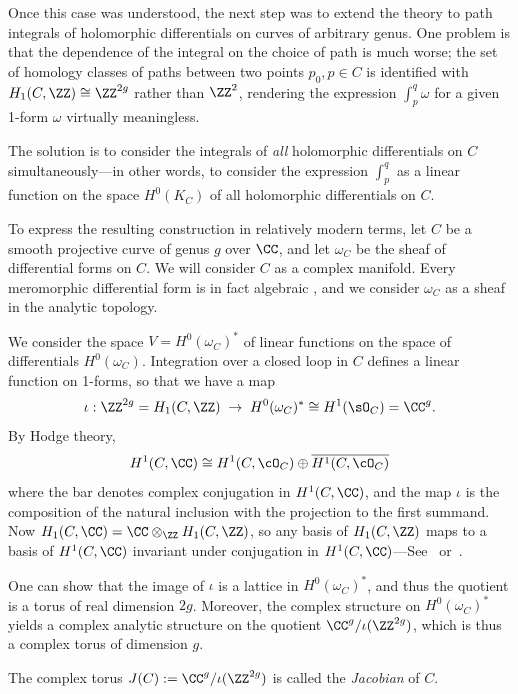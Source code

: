 Once this case was understood, the next step was to extend the theory to path integrals of holomorphic differentials on curves of arbitrary genus. One problem is that the dependence of the integral on the choice of path is much worse; the set of homology classes of paths between two points $p_0, p \in C$ is identified with $H_1(C,\ZZ) \cong \ZZ^{2g}$ rather than $\ZZ^2$, rendering the expression $\int_p^q \omega$ for a given 1-form $\omega$ virtually meaningless.

The solution is to  consider the integrals of \emph{all} holomorphic differentials on $C$ simultaneously---in other words, to consider the expression $\int_p^q$ as a linear function on the space $H^0(K_C)$ of all holomorphic differentials on $C$.

To express the resulting construction in relatively modern terms, let $C$ be a smooth projective curve of genus $g$ over $\CC$, and let $\omega_{C}$ be the sheaf of differential forms on $C$. We will consider $C$ as a complex manifold. Every meromorphic differential form is in fact algebraic
\cite{SerreGAGA}, and we consider $\omega_{C}$ as a sheaf in the analytic topology.

We consider the space $V = H^0(\omega_C)^*$ of linear functions on the space of differentials $H^0(\omega_C)$.  Integration over a closed loop in $C$ defines a linear function on 1-forms, so that we have a map
$$
\iota: \ZZ^{2g} = H_1(C,\ZZ) \; \to \;  H^0(\omega_C)^* \cong H^1(\sO_C) = \CC^{g}.
$$
By Hodge theory, 
$$
H^1(C, \CC) \cong H^1(C, \cO_C) \oplus \overline{H^1(C, \cO_C)}
$$
where the bar denotes complex conjugation in $H^1(C, \CC)$, and the map $\iota$ is the composition of 
 the natural inclusion with the projection to the first summand.
 Now
$H_1(C,\CC) = \CC\otimes_\ZZ H_1(C,\ZZ)$, so any basis of $H_1(C,\ZZ)$ maps to a basis of 
 $H^1(C, \CC)$ invariant under conjugation in $H^1(C, \CC)$---See~\cite{Voisin} or~\cite[p. 116]{Griffiths-Harris1978}. 

One can show that the image of $\iota$ is a lattice in $H^0(\omega_C)^*$, and thus the quotient
is a torus of real dimension $2g$. Moreover, the
complex structure on $H^0(\omega_C)^*$ yields a complex analytic structure on the quotient $\CC^{g}/\iota(\ZZ^{2g})$, which is thus a complex torus of  dimension $g$.  

\begin{definition}
 The complex torus $J(C) := \CC^{g}/\iota(\ZZ^{2g})$ is called the \emph{Jacobian} of $C$.
\end{definition}

